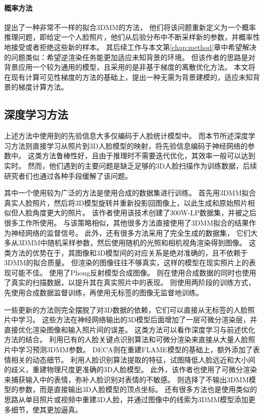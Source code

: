 \paragraph{概率方法}
\citet{schonborn2013monte}提出了一种非常不一样的拟合3DMM的方法，
他们将该问题重新定义为一个概率推理问题，即给定一个人脸照片，他们从后验分布中不断采样新的参数，并概率性地接受或者拒绝这些新的样本。
其后续工作\citep{SchonbornEFV15}与本文第\ref{chap:method}章中希望解决的问题类似：希望逆渲染任务能更加适应未知背景的环境。
但该作者的思路是对背景应用一个较为通用的模型，且采用的是非基于梯度的离散优化方法。
本文将在现有计算可见性梯度的方法的基础上，提出一种无需为背景建模的，适应未知背景的梯度计算方法。

\subsection{深度学习方法}

上述方法中使用到的先验信息大多仅编码于人脸统计模型中。
而本节所述深度学习方法则直接学习从照片到3D人脸模型的映射，将先验信息编码于神经网络的参数中。
这类方法鲁棒性好，且由于推理时不需要迭代优化，其效率一般可以达到实时。
然而，他们遇到的主要问题是缺乏足够的3D人脸扫描作为训练数据，后续研究者们也通过各种手段缓解了该问题。

其中一个使用较为广泛的方法是使用合成的数据集进行训练。
\citet{zhu2016face}首先用3DMM拟合真实人脸照片，然后将3D模型旋转并重新投影回图像上，以此生成和原始照片相似但人脸角度更大的照片。
该作者使用该技术创建了300W-LP数据集，并被之后很多工作所使用。
与该策略相似，其他很多方法\citep{trần2018extreme,chaudhuri2019joint}直接使用了3DMM拟合的结果作为神经网络的监督信号。
此外，还有很多方法采用了完全生成的数据集，
它们大多从3DMM中随机采样参数，然后使用随机的光照和相机视角渲染得到图像。
这类方法的优势在于，其图像和3D模型间的对应关系是绝对准确的，且不依赖于3DMM的拟合质量。
但渲染的图像往往不够真实，这样的模型在现实照片上的表现可能不佳。
\citet{richardson20163d}使用了Phong反射模型合成图像。
\citet{dou2017end}则在使用合成数据的同时也使用了真实的扫描数据，以提升其在真实照片中的表现。
\citet{genova2018unsupervised}则使用两阶段的训练方式，先使用合成数据监督训练，再使用无标签的图像无监督地训练。

一些更新的方法则完全摆脱了对3D数据的依赖，它们可以直接从无标签的人脸照片中学习。
这些方法在神经网络输出的3D模型后面增加了一层可微分渲染层，并直接优化渲染图像和输入照片间的误差。
这类方法可以看作深度学习与前述优化方法的结合。
\citet{deep3d,bao2022}利用已有的人脸关键点识别算法和可微分渲染来直接从大量人脸照片中学习预测3DMM参数。
DECA\citep{DECA}则在重建FLAME模型的基础上，额外添加了表情相关的动态细节。
\citet{ZielonkaBT22}利用人脸识别算法提取的特征，试图降低人脸远近和大小间的歧义，重建物理尺度更准确的3D人脸模型。
此外，该作者也使用了可微分渲染来捕获输入中的表情，弥补人脸识别对表情的不敏感。
\citet{shen2022,feng2018prn}则选择了不输出3DMM模型的参数，而是直接输出3D人脸模型的顶点坐标。
还有很多方法\citep{CaoBZB15,IchimBP15}也是使用类似的思路从单目照片或视频中重建3D人脸，并通过图像中的线索为3DMM模型添加更多细节，使其更加逼真。

